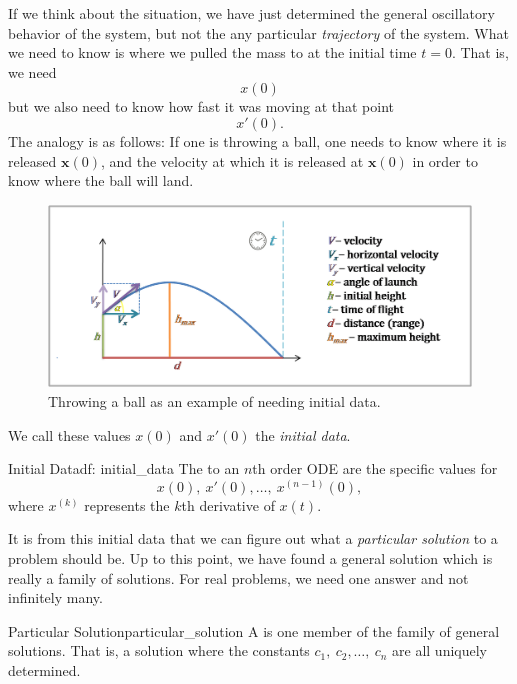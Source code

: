         If we think about the situation, we have just determined the general oscillatory behavior of the system, but not the any particular \emph{trajectory} of the system. What we need to know is where we pulled the mass to at the initial time $t=0$. That is, we need
        \[
        x(0)
        \]
        but we also need to know how fast it was moving at that point
        \[
        x'(0).
        \]
        The analogy is as follows: If one is throwing a ball, one needs to know where it is released $\mathbf{x}(0)$, and the velocity at which it is released at $\mathbf{x}(0)$ in order to know where the ball will land.
        \begin{figure}[H]
            \centering
            \includegraphics[width=.7\textwidth]{Figures/projectile-motion.png}
            \caption{Throwing a ball as an example of needing initial data.}
            \label{fig:proj_motion}
        \end{figure}
        \noindent We call these values $x(0)$ and $x'(0)$ the \emph{initial data}.

        \begin{df}{Initial Data}{df: initial_data}
            The   to an $n$th order ODE are the specific values for
            \[
            x(0),~ x'(0),\dots,~ x^{(n-1)}(0),
            \]
            where $x^{(k)}$ represents the $k$th derivative of $x(t)$.
        \end{df}

        \noindent It is from this initial data that we can figure out what a \emph{particular solution} to a problem should be.  Up to this point, we have found a general solution which is really a family of solutions. For real problems, we need one answer and not infinitely many.

        \begin{df}{Particular Solution}{particular_solution}
            A  is one member of the family of general solutions.  That is, a solution where the constants $c_1,~c_2,\dots,~c_n$ are all uniquely determined.
        \end{df}

